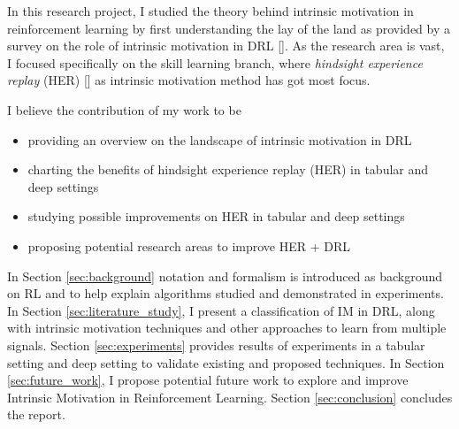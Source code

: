 \documentclass[conference]{IEEEtran}
\begin{document}
In this research project, I studied the theory behind intrinsic motivation in reinforcement learning by first understanding the lay of the land as provided by a survey on the role of intrinsic motivation in DRL [\cite{aubret2019survey}]. As the research area is vast, I focused specifically on the skill learning branch, where \textit{hindsight experience replay} (HER) [\cite{andrychowicz2017hindsight}] as intrinsic motivation method has got most focus.

I believe the contribution of my work to be
\begin{itemize}
    \item providing an overview on the landscape of intrinsic motivation in DRL
    \item charting the benefits of hindsight experience replay (HER) in tabular and deep settings
    \item studying possible improvements on HER in tabular and deep settings
    \item proposing potential research areas to improve HER + DRL
\end{itemize}{}

In Section \ref{sec:background} notation and formalism is introduced as background on RL and to help explain algorithms studied and demonstrated in experiments. In Section \ref{sec:literature_study}, I present a classification of IM in DRL, along with intrinsic motivation techniques and other approaches to learn from multiple signals. Section \ref{sec:experiments} provides results of experiments in a tabular setting and deep setting to validate existing and proposed techniques. In Section \ref{sec:future_work}, I propose potential future work to explore and improve Intrinsic Motivation in Reinforcement Learning. Section \ref{sec:conclusion} concludes the report.
\end{document}
